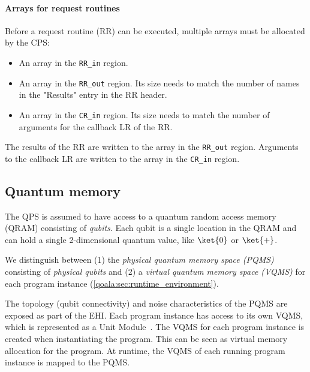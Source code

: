 \paragraph{Arrays for request routines}
Before a request routine (RR) can be executed, multiple arrays must be allocated by the CPS:
\begin{itemize}
\item An array in the \texttt{RR\_in} region. 
\item An array in the \texttt{RR\_out} region. Its size needs to match the number of names in the "Results" entry in the RR header.
\item An array in the \texttt{CR\_in} region. Its size needs to match the number of arguments for the callback LR of the RR.
\end{itemize}

The results of the RR are written to the array in the \mbox{\texttt{RR\_out}} region. Arguments to the callback LR are written to the array in the \texttt{CR\_in} region.



\subsection{Quantum memory}
\label{qoala:sec:app:quantum_memory}
The QPS is assumed to have access to a quantum random access memory (QRAM) consisting of \textit{qubits}.
Each qubit is a single location in the QRAM and can hold a single 2-dimensional quantum value, like $\ket{0}$ or $\ket{+}$.

We distinguish between (1) the \textit{physical quantum memory space (PQMS)} consisting of \textit{physical qubits}
and (2) a \textit{virtual quantum memory space (VQMS)} for each program instance (\cref{qoala:sec:runtime_environment}).

The topology (qubit connectivity) and noise characteristics of the PQMS are exposed as part of the EHI.
Each program instance has access to its own VQMS, which is represented as a Unit Module~\cite{dahlberg2022netqasm}.
The VQMS for each program instance is created when instantiating the program.
This can be seen as virtual memory allocation for the program.
At runtime, the VQMS of each running program instance is mapped to the PQMS.

